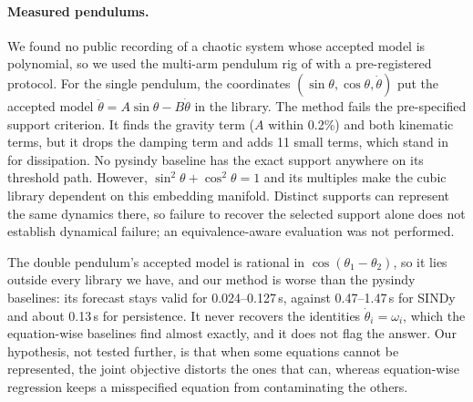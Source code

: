\paragraph{Measured pendulums.} We found no public recording of a chaotic system whose accepted model is polynomial, so we used the multi-arm pendulum rig of \citet{kaheman2023pendulum} with a pre-registered protocol. For the single pendulum, the coordinates $(\sin\theta,\cos\theta,\dot\theta)$ put the accepted model $\ddot\theta=A\sin\theta-B\dot\theta$ in the library. The method fails the pre-specified support criterion. It finds the gravity term ($A$ within 0.2\%) and both kinematic terms, but it drops the damping term and adds 11 small terms, which stand in for dissipation. No pysindy baseline has the exact support anywhere on its threshold path. However, $\sin^2\theta+\cos^2\theta=1$ and its multiples make the cubic library dependent on this embedding manifold. Distinct supports can represent the same dynamics there, so failure to recover the selected support alone does not establish dynamical failure; an equivalence-aware evaluation was not performed.

The double pendulum's accepted model is rational in $\cos(\theta_1-\theta_2)$, so it lies outside every library we have, and our method is worse than the pysindy baselines: its forecast stays valid for 0.024--0.127\,s, against 0.47--1.47\,s for SINDy and about 0.13\,s for persistence. It never recovers the identities $\dot\theta_i=\omega_i$, which the equation-wise baselines find almost exactly, and it does not flag the answer. Our hypothesis, not tested further, is that when some equations cannot be represented, the joint objective distorts the ones that can, whereas equation-wise regression keeps a misspecified equation from contaminating the others.
